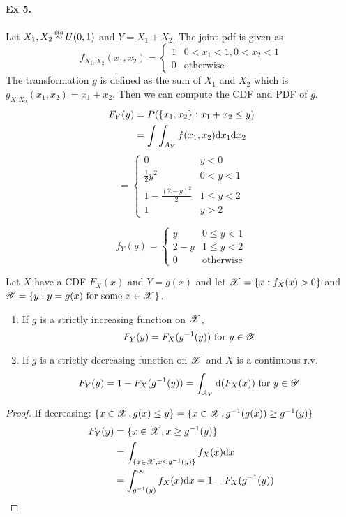 	\paragraph{Ex 5.}
	Let $X_1, X_2 \iidsim U(0,1)$ and $Y = X_1 + X_2$. The joint pdf is given as 
	$$f_{X_1,X_2}(x_1, x_2) = \left\{
	\begin{array}{ll}
		1 & 0<x_1<1, 0<x_2<1\\
		0 & \text{otherwise}
	\end{array}
	\right.
	$$
	The transformation $g$ is defined as the sum of $X_1$ and $X_2$ which is $g_{X_1X_2}(x_1,x_2) = x_1 + x_2$.
	Then we can compute the CDF and PDF of $g$.
	\begin{align*}
		F_Y(y) &= P(\{x_1,x_2\}:x_1+x_2\leq y)\\
		&= \int\int_{A_Y}f(x_1,x_2)\mathrm{d} x_1 \mathrm{d} x_2
	\end{align*}
	$$=\left\{
	\begin{array}{ll}
		0 & y<0\\
		\frac{1}{2}y^2 & 0<y<1\\
		1-\frac{(2-y)^2}{2} & 1\leq y< 2\\
		1 & y>2
	\end{array}
	\right.$$

	$$f_Y(y) = \left\{
	\begin{array}{ll}
		y & 0\leq y< 1\\
		2-y & 1\leq y < 2\\
		0 & \text{otherwise}
	\end{array}
	\right.
	$$


	\begin{theorem}
		Let $X$ have a CDF $F_X(x)$ and $Y=g(x)$ and let $\mathscr{X} = \{x:f_X(x)>0\}$ and $\mathscr{Y} = \{y:y=g(x) \text{ for some } x\in \mathscr{X}\}$.
		\begin{enumerate}[(1)]
			\item If $g$ is a strictly increasing function on $\mathscr{X}$,
			$$F_Y(y) = F_X(g^{-1}(y)) \text{ for }y\in \mathscr{Y}$$
			\item If $g$ is a strictly decreasing function on $\mathscr{X}$ and $X$ is a continuous r.v.
			$$F_Y(y) = 1-F_X(g^{-1}(y)) = \int_{A_Y}\mathrm{d}(F_X(x)) \text{ for }y\in \mathscr{Y}$$
		\end{enumerate}
	\end{theorem}
	
	\begin{proof}
		If decreasing: $\{x\in \mathscr{X}, g(x)\leq y\} = \{x\in \mathscr{X}, g^{-1}(g(x))\geq g^{-1}(y)\}$ 
		\begin{align*}
			F_Y(y) & = \{x\in\mathscr{X}, x\geq g^{-1}(y)\}\\
			       & = \int_{\{x\in \mathscr{X}, x\leq g^{-1}(y)\}} f_X(x)\mathrm{d} x\\
			       & = \int_{g^{-1}(y)}^{\infty}f_X(x)\mathrm{d} x = 1-F_X(g^{-1}(y))
		\end{align*}
	\end{proof}
	
